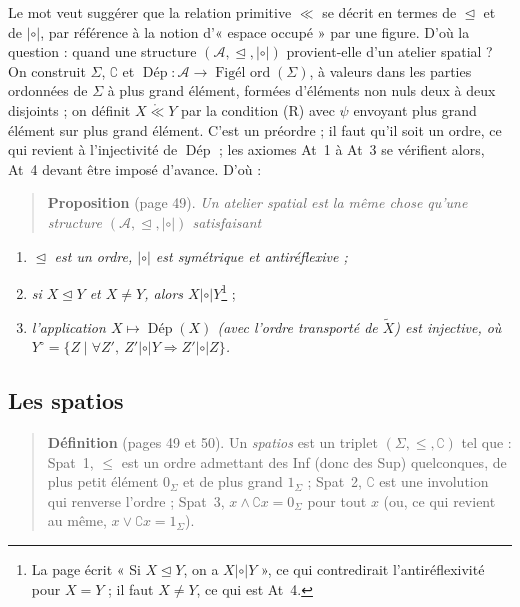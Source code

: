 \documentclass[11pt,a4paper]{article}
\begin{document}
Le mot veut suggérer que la relation primitive $\ll$ se décrit en termes de
$\trianglelefteq$ et de $\mathrel{|\circ|}$, par référence à la notion
d'« espace occupé » par une figure. D'où la question : quand une structure
$(\mathcal{A}, \trianglelefteq, \mathrel{|\circ|})$ provient-elle d'un atelier
spatial ? On construit $\Sigma$, $\complement$ et $\operatorname{\text{Dép}} :
\mathcal{A} \to \operatorname{\text{Figél ord}}(\Sigma)$, à valeurs dans les
parties ordonnées de $\Sigma$ à plus grand élément, formées d'éléments non nuls
deux à deux disjoints ; on définit $X \mathrel{\mathring{\ll}} Y$ par la condition
(R) avec $\psi$ envoyant plus grand élément sur plus grand élément. C'est un
préordre ; il faut qu'il soit un ordre, ce qui revient à l'injectivité de
$\operatorname{\text{Dép}}$ ; les axiomes At~1 à At~3 se vérifient alors, At~4
devant être imposé d'avance. D'où :

\begin{quote}
\textbf{Proposition} (page 49). \emph{Un atelier spatial est la même chose qu'une
structure $(\mathcal{A}, \trianglelefteq, \mathrel{|\circ|})$ satisfaisant}
\end{quote}
\begin{enumerate}
\item[Atspat 1.] $\trianglelefteq$ \emph{est un ordre, $\mathrel{|\circ|}$ est
symétrique et antiréflexive ;}
\item[Atspat 2.] \emph{si $X \trianglelefteq Y$ et $X \neq Y$, alors $X
\mathrel{|\circ|} Y$}\footnote{La page écrit « Si $X \trianglelefteq Y$, on a $X
\mathrel{|\circ|} Y$ », ce qui contredirait l'antiréflexivité pour $X = Y$ ; il
faut $X \neq Y$, ce qui est At~4.} ;
\item[Atspat 3.] \emph{l'application $X \mapsto \operatorname{\text{Dép}}(X)$
(avec l'ordre transporté de $\widetilde{X}$) est injective, où $Y^{\circ} = \{ Z
\mid \forall Z',\ Z' \mathrel{|\circ|} Y \Rightarrow Z' \mathrel{|\circ|} Z
\}$.}
\end{enumerate}

\subsection*{Les spatios}

\begin{quote}
\textbf{Définition} (pages 49 et 50). Un \emph{spatios} est un triplet $(\Sigma,
\leq, \complement)$ tel que : Spat~1, $\leq$ est un ordre admettant des Inf (donc
des Sup) quelconques, de plus petit élément $0_{\Sigma}$ et de plus grand
$1_{\Sigma}$ ; Spat~2, $\complement$ est une involution qui renverse l'ordre ;
Spat~3, $x \wedge \complement x = 0_{\Sigma}$ pour tout $x$ (ou, ce qui revient
au même, $x \vee \complement x = 1_{\Sigma}$).
\end{quote}
\end{document}
